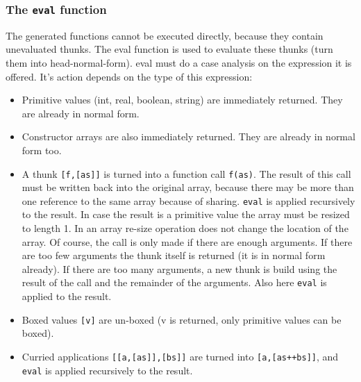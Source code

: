\subsubsection{The \texttt{eval} function}
The generated \JS functions cannot be executed directly, because they contain unevaluated thunks.
The \textsf{eval} function is used to evaluate these thunks (turn them into head-normal-form).
\textsf{eval} must do a case analysis on the expression it is offered.
It's action depends on the type of  this expression:

\begin{itemize}
\item Primitive values (int, real, boolean, string) are immediately returned. They are already in normal form.
\item Constructor arrays  are also immediately returned. They are already in normal form too.
\item A thunk \texttt{[f,[as]]} is turned into a function call \texttt{f(as)}.
The result of this call must be written back into the original array, because there may be more than
one reference to the same array because of sharing. 
\texttt{eval} is applied recursively to the result.
In case the result is a primitive value the array must be resized to length 1.
In \JS an array re-size operation does not change the location of the array.  
Of course, the call is only made if there are enough arguments. 
If there are too few arguments the thunk itself is returned (it is in normal form already).
If there are too many arguments, a new thunk
is build using the result of the call and the remainder of the arguments.
Also here \texttt{eval} is applied to the result. 
\item Boxed values \texttt{[v]} are un-boxed (v is returned, only primitive values can be boxed).
\item Curried applications \texttt{[[a,[as]],[bs]]} are turned into  \texttt{[a,[as++bs]]}, and
\texttt{eval} is applied recursively to the result.
\end{itemize}

